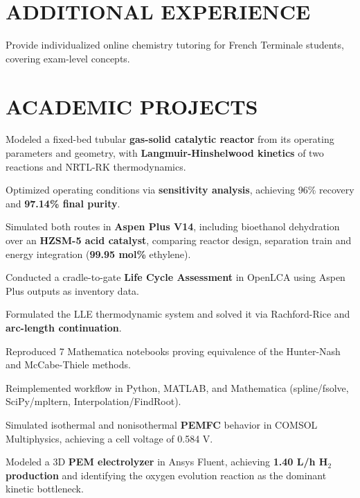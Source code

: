 \documentclass[10pt]{article}
\begin{document}
\section{ADDITIONAL EXPERIENCE}
\begin{bul}
\item Provide individualized online chemistry tutoring for French Terminale students, covering exam-level concepts.
\end{bul}

\section{ACADEMIC PROJECTS}
\begin{bul}
\item Modeled a fixed-bed tubular \textbf{gas-solid catalytic reactor} from its operating parameters and geometry, with \textbf{Langmuir-Hinshelwood kinetics} of two reactions and NRTL-RK thermodynamics.
\item Optimized operating conditions via \textbf{sensitivity analysis}, achieving 96\% recovery and \textbf{97.14\% final purity}.
\end{bul}
\begin{bul}
\item Simulated both routes in \textbf{Aspen Plus V14}, including bioethanol dehydration over an \textbf{HZSM-5 acid catalyst}, comparing reactor design, separation train and energy integration (\textbf{99.95 mol\%} ethylene).
\item Conducted a cradle-to-gate \textbf{Life Cycle Assessment} in OpenLCA using Aspen Plus outputs as inventory data.
\end{bul}
\begin{bul}
\item Formulated the LLE thermodynamic system and solved it via Rachford-Rice and \textbf{arc-length continuation}.
\item Reproduced 7 Mathematica notebooks proving equivalence of the Hunter-Nash and McCabe-Thiele methods.
\item Reimplemented workflow in Python, MATLAB, and Mathematica (spline/fsolve, SciPy/mpltern, Interpolation/FindRoot).
\end{bul}
\begin{bul}
\item Simulated isothermal and nonisothermal \textbf{PEMFC} behavior in COMSOL Multiphysics, achieving a cell voltage of 0.584 V.
\item Modeled a 3D \textbf{PEM electrolyzer} in Ansys Fluent, achieving \textbf{1.40 L/h H$_2$ production} and identifying the oxygen evolution reaction as the dominant kinetic bottleneck.
\end{bul}
\end{document}
